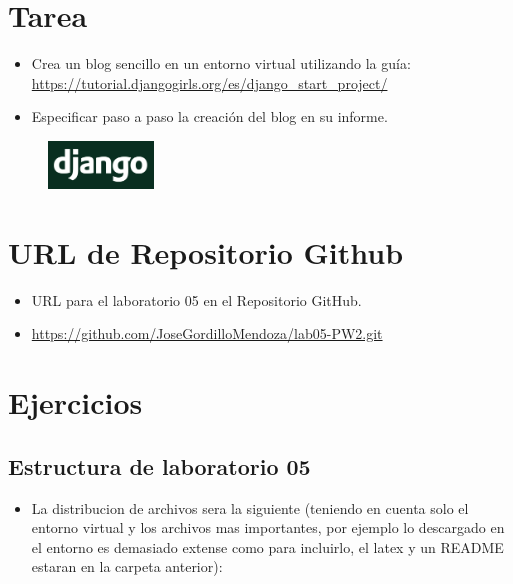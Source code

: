 \documentclass{article}
\begin{document}
	\section{Tarea}
	\begin{itemize}		
		\item Crea un blog sencillo en un entorno virtual utilizando la guía: \url{https://tutorial.djangogirls.org/es/django_start_project/}
            \item Especificar paso a paso la creación del blog en su informe.
	\end{itemize}
        \begin{figure}[H]
		\centering
		\includegraphics[width=0.25\textwidth,keepaspectratio]{img/django.png}
	\end{figure}

	\section{URL de Repositorio Github}
	\begin{itemize}
		\item URL para el laboratorio 05 en el Repositorio GitHub.
		\item \url{https://github.com/JoseGordilloMendoza/lab05-PW2.git}
	\end{itemize}
	
	\section{Ejercicios}
 
        \subsection{Estructura de laboratorio 05}
	\begin{itemize}	
		\item La distribucion de archivos sera la siguiente (teniendo en cuenta solo el entorno virtual y los archivos mas importantes, por ejemplo lo descargado en el entorno es demasiado extense como para incluirlo, el latex y un README estaran en la carpeta anterior):
	\end{itemize}
	
\end{document}
